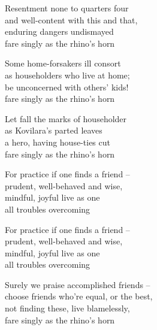 \begin{MyDescription}{}  	
Resentment none to quarters four\\
and well-content with this and that,\\
enduring dangers undismayed\\
fare singly as the rhino's horn
\end{MyDescription} 
   
\begin{MyDescription}{}  	
Some home-forsakers ill consort\\
as householders who live at home;\\
be unconcerned with others' kids!\\
fare singly as the rhino's horn
\end{MyDescription} 
   
\begin{MyDescription}{}  	
Let fall the marks of householder\\
as Kovilara's parted leaves\\
a hero, having house-ties cut\\
fare singly as the rhino's horn	
\end{MyDescription} 

\begin{MyDescription}{}  	
   For practice if one finds a friend – \\
   prudent, well-behaved and wise,\\
   mindful, joyful live as one\\
   all troubles overcoming
\end{MyDescription} 

\begin{MyDescription}{}  	
For practice if one finds a friend – \\
prudent, well-behaved and wise,\\
mindful, joyful live as one\\
all troubles overcoming
\end{MyDescription} 

\begin{MyDescription}{}  	
Surely we praise accomplished friends – \\
choose friends who're equal, or the best,\\
not finding these, live blamelessly,\\
fare singly as the rhino's horn
\end{MyDescription}
   

